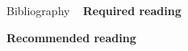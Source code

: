 \documentclass[t]{beamer}
\begin{document}
%
%
%



\begin{ftst}
{Bibliography}
{\ }
\scriptsize
\textbf{Required reading}

\benums %
\eenum

\textbf{Recommended reading}

\benums %
\eenum
\end{ftst}

\end{document}
